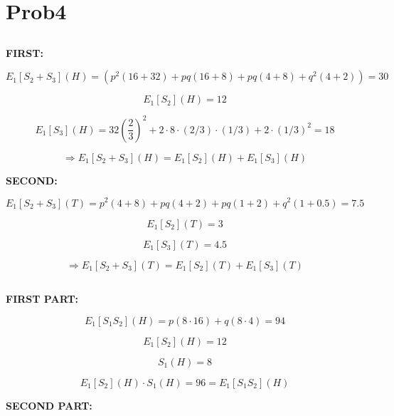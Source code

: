 \documentclass[paper=a4, fontsize=11pt]{scrartcl} %
\numberwithin{equation}{section} %
\numberwithin{figure}{section} %
\numberwithin{table}{section} %
\begin{document}
\newpage

\section{Prob4}

\subsection{}

\textbf{FIRST:}

$$ E_{1}[S_{2}+S_{3}](H) = ( p^{2}(16+32) + pq(16+8) + pq(4+8) + q^{2}(4+2) ) = 30 $$



$$ E_{1}[S_{2}](H) = 12 $$

$$ E_{1}[S_{3}](H) = 32\left(\frac{2}{3}\right)^2 + 2 \cdot 8 \cdot (2/3) \cdot (1/3) + 2 \cdot (1/3)^2 = 18 $$


$$ \Rightarrow E_{1}[S_{2} + S_{3}](H) = E_{1}[S_{2}](H) + E_{1}[S_{3}](H) $$


\textbf{SECOND:}

$$ E_{1}[S_{2}+S_{3}](T) = p^{2}(4+8) + pq(4+2) + pq(1+2) + q^{2}(1+0.5) = 7.5 $$


$$ E_{1}[S_{2}](T) = 3 $$

$$ E_{1}[S_{3}](T) = 4.5 $$

$$ \Rightarrow E_{1}[S_{2} + S_{3}](T) = E_{1}[S_{2}](T) + E_{1}[S_{3}](T) $$



\subsection{}

\textbf{FIRST PART:}

$$ E_{1}[S_{1}S_{2}](H) = p(8 \cdot 16) + q(8 \cdot 4) = 94 $$


$$ E_{1}[S_{2}](H) = 12 $$

$$ S_{1}(H) = 8 $$

$$ E_{1}[S_{2}](H) \cdot S_{1}(H) = 96 = E_{1}[S_{1}S_{2}](H) $$



\textbf{SECOND PART:}
\end{document}

